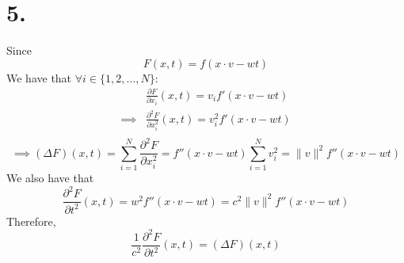 \documentclass[11pt]{article}
\begin{document}
\section*{5.}
Since 
\[
F(x,t) = f(x \cdot v - wt)
\]
We have that $\forall i \in \{1,2, \ldots, N \}:$
\begin{equation*}
\begin{aligned}
&\frac{\partial F}{\partial x_i}(x,t) = v_i f'(x \cdot v - wt) \\ 
\implies &\frac{\partial^2 F}{\partial x_i^2} (x,t) = v_i^2 f'(x \cdot v -wt) \\ 
\end{aligned}
\end{equation*}
\[
\implies (\Delta F)(x,t) = \sum_{i=1}^N \frac{\partial^2 F}{\partial x_i^2} = f''(x\cdot v -wt)\sum_{i=1}^N v_i^2 = \|v\|^2 f''(x\cdot v -wt)
\]
We also have that 
\[
\frac{\partial^2 F}{\partial t^2}(x,t) = w^2 f''(x\cdot v -wt) = c^2 \|v\|^2 f''(x\cdot v -wt)
\]
Therefore, 
\[
\frac{1}{c^2} \frac{\partial^2 F}{\partial t^2}(x,t) = (\Delta F) (x,t)
\]
\pagebreak
\end{document}
